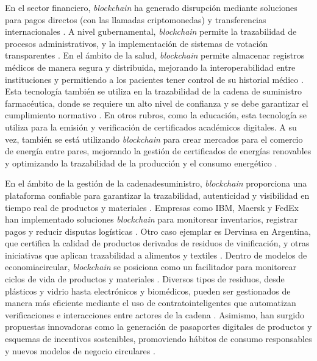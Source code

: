 En el sector financiero, \textit{blockchain} ha generado disrupción mediante soluciones para pagos directos (con las llamadas \glspl{criptomoneda}) y transferencias internacionales \cite{bartolomeo2020introduccion}. A nivel gubernamental, \textit{blockchain} permite la \gls{trazabilidad} de procesos administrativos, y la implementación de sistemas de votación transparentes \cite{vaigandla2023review}. En el ámbito de la salud, \textit{blockchain} permite almacenar registros médicos de manera segura y distribuida, mejorando la interoperabilidad entre instituciones y permitiendo a los pacientes tener control de su historial médico \cite{sunny2022systematic}. Esta tecnología también se utiliza en la trazabilidad de la cadena de suministro farmacéutica, donde se requiere un alto nivel de confianza y se debe garantizar el cumplimiento normativo \cite{vaigandla2023review}. En otros rubros, como la educación, esta tecnología se utiliza para la emisión y verificación de certificados académicos digitales. A su vez, también se está utilizando \textit{blockchain} para crear mercados para el comercio de energía entre pares, mejorando la gestión de certificados de energías renovables y optimizando la trazabilidad de la producción y el consumo energético \cite{sunny2022systematic, vaigandla2023review}.

En el ámbito de la gestión de la \gls{cadenadesuministro}, \textit{blockchain} proporciona una plataforma confiable para garantizar la trazabilidad, autenticidad y visibilidad en tiempo real de productos y materiales \cite{torres2022tendencias, sharabati2024blockchain}. Empresas como IBM, Maersk y FedEx han implementado soluciones \textit{blockchain} para monitorear inventarios, registrar pagos y reducir disputas logísticas \cite{tripathi2023comprehensive}. Otro caso ejemplar es Dervinsa en Argentina, que certifica la calidad de productos derivados de residuos de vinificación, y otras iniciativas que aplican trazabilidad a alimentos y textiles \cite{bartolomeo2020introduccion}. Dentro de modelos de \gls{economiacircular}, \textit{blockchain} se posiciona como un facilitador para monitorear ciclos de vida de productos y materiales \cite{bulkowska2023implementation, baralla2023waste}. Diversos tipos de residuos, desde plásticos y vidrio hasta electrónicos y biomédicos, pueden ser gestionados de manera más eficiente mediante el uso de \glspl{contratointeligente} que automatizan verificaciones e interacciones entre actores de la cadena \cite{baralla2023waste}. Asimismo, han surgido propuestas innovadoras como la generación de pasaportes digitales de productos y esquemas de incentivos sostenibles, promoviendo hábitos de consumo responsables y nuevos modelos de negocio circulares \cite{baralla2023waste}.

